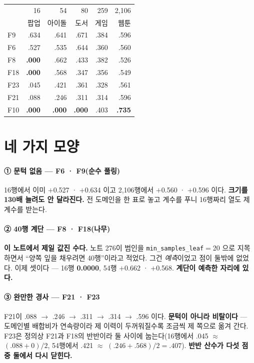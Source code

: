 \documentclass[10pt]{article}
\begin{document}
\begin{center}\small
\begin{tabular}{lrrrrr}
\hline
& 16 & 54 & 80 & 259 & 2,106 \\
& 팝업 & 아이돌 & 도서 & 게임 & 웹툰 \\
\hline
F9 & .634 & .641 & .671 & .384 & .596 \\
F6 & .527 & .535 & .644 & .360 & .560 \\
\hline
F8 & \textbf{.000} & .662 & .433 & .382 & .526 \\
F18 & \textbf{.000} & .568 & .347 & .356 & .549 \\
\hline
F23 & .045 & .421 & .361 & .328 & .561 \\
F21 & .088 & .246 & .311 & .314 & .596 \\
\hline
F10 & \textbf{.000} & \textbf{.000} & \textbf{.000} & .403 & \textbf{.735} \\
\hline
\end{tabular}
\end{center}

\section{네 가지 모양}

\paragraph{① 문턱 없음 --- F6 · F9(순수 풀링)} 16행에서 이미 $+$0.527 ·
$+$0.634 이고 2,106행에서 $+$0.560 · $+$0.596 이다. \textbf{크기를 130배
늘려도 안 달라진다.} 전 도메인을 한 표로 놓고 계수를 푸니 16행짜리 열도 제
계수를 받는다.

\paragraph{② 40행 계단 --- F8 · F18(나무)} \textbf{이 노트에서 제일 값진
수다.} 노트 276이 범인을 \texttt{min\_samples\_leaf}$=$20 으로 지목하면서
``양쪽 잎을 채우려면 40행''이라고 적었다. 그건 \emph{예측}이었고 점이 둘밖에
없었다. 이제 셋이다 --- 16행 \textbf{0.0000}, 54행 $+$0.662 · $+$0.568.
\textbf{계단이 예측한 자리에 있다.}

\paragraph{③ 완만한 경사 --- F21 · F23} F21이 .088 $\to$ .246 $\to$ .311
$\to$ .314 $\to$ .596 이다. \textbf{문턱이 아니라 비탈이다} --- 도메인별
배합비가 연속량이라 제 이력이 두꺼워질수록 조금씩 제 쪽으로 옮겨 간다.
F23은 정의상 F21과 F18의 반반이라 둘 사이에 눕는다(16행에서 .045 $\approx$
$(.088{+}0)/2$, 54행에서 .421 $\approx$ $(.246{+}.568)/2{=}.407$).
\textbf{반반 산수가 다섯 점 중 둘에서 다시 닫힌다.}
\end{document}
